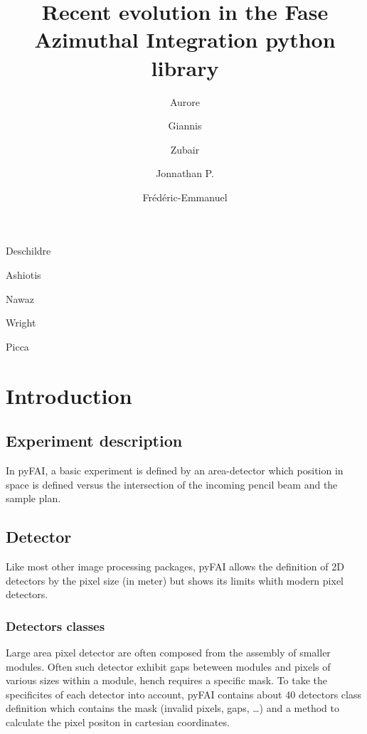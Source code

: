 \documentclass[preprint]{iucr}
\begin{document}
\title{Recent evolution in the Fase Azimuthal Integration python library}

    \author[a]{Aurore}{Deschildre}
    \author[a]{Giannis}{Ashiotis}
    \author[b]{Zubair}{Nawaz}
    \author[a]{Jonnathan P.}{Wright}
    \author[c]{Fr\'ed\'eric-Emmanuel}{Picca}

\maketitle

\begin{synopsis}

\end{synopsis}

\begin{abstract}
\end{abstract}

\section{Introduction}

\subsection{Experiment description}
In pyFAI, a basic experiment is defined by an area-detector which position in
space is defined versus the intersection of the incoming pencil beam and the
sample plan. 

\subsection{Detector}
Like most other image processing packages, pyFAI allows the definition of 2D
detectors by the pixel size (in meter) but shows its limits whith modern pixel
detectors.

\subsubsection{Detectors classes}
Large area pixel detector are often composed from the assembly of smaller
modules. Often such detector exhibit gaps beteween modules and pixels of various
sizes within a module, hench requires a specific mask.
To take the specificites of each detector into account, pyFAI contains about
40 detectors class definition which contains the mask (invalid pixels, gaps,
\ldots) and a method to calculate the pixel positon in cartesian coordinates. 
\end{document}
